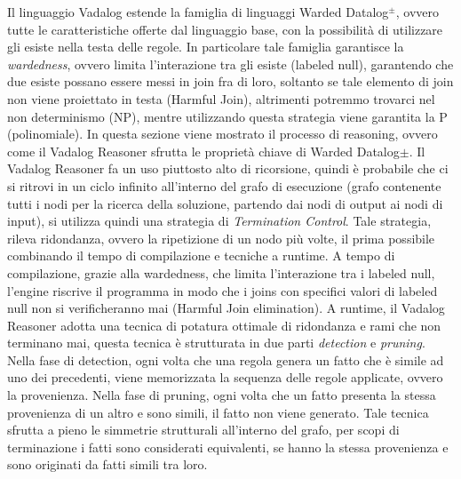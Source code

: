 Il linguaggio Vadalog estende la famiglia di linguaggi Warded Datalog$^\pm $, ovvero tutte le caratteristiche offerte dal linguaggio base, con la possibilità di utilizzare gli esiste nella testa delle regole. \newline
In particolare tale famiglia garantisce la \textit{wardedness}, ovvero limita l'interazione tra gli esiste (labeled null), garantendo che due esiste possano essere messi in join fra di loro, soltanto se tale elemento di join non viene proiettato in testa (Harmful Join), altrimenti potremmo trovarci nel non determinismo (NP), mentre utilizzando questa strategia viene garantita la P  (polinomiale).\newline \newline
In questa sezione viene mostrato il processo di reasoning, ovvero come il Vadalog Reasoner sfrutta le proprietà chiave di Warded Datalog$\pm$. \newline
Il Vadalog Reasoner fa un uso piuttosto alto di ricorsione, quindi è probabile che ci si ritrovi in un ciclo infinito all'interno del grafo di esecuzione (grafo contenente tutti i nodi per la ricerca della soluzione, partendo dai nodi di output ai nodi di input), si utilizza quindi una strategia di \textit{Termination Control}. \newline
Tale strategia, rileva ridondanza, ovvero la ripetizione di un nodo più volte, il prima possibile combinando il tempo di compilazione e tecniche a runtime. \newline
A tempo di compilazione, grazie alla wardedness, che limita l'interazione tra i labeled null, l'engine riscrive il programma in modo che i joins con specifici valori di labeled null non si verificheranno mai (Harmful Join elimination). \newline
A runtime, il Vadalog Reasoner adotta una tecnica di potatura ottimale di ridondanza e rami che non terminano mai, questa tecnica è strutturata in due parti \emph{detection} e \emph{pruning}. \newline
Nella fase di detection, ogni volta che una regola genera un fatto che è simile ad uno dei precedenti, viene memorizzata la sequenza delle regole applicate, ovvero la provenienza. \newline
Nella fase di pruning, ogni volta che un fatto presenta la stessa provenienza di un altro e sono simili, il fatto non viene generato. \newline
Tale tecnica sfrutta a pieno le simmetrie strutturali all'interno del grafo, per scopi di terminazione i fatti sono considerati equivalenti, se hanno la stessa provenienza e sono originati da fatti simili tra loro. 

